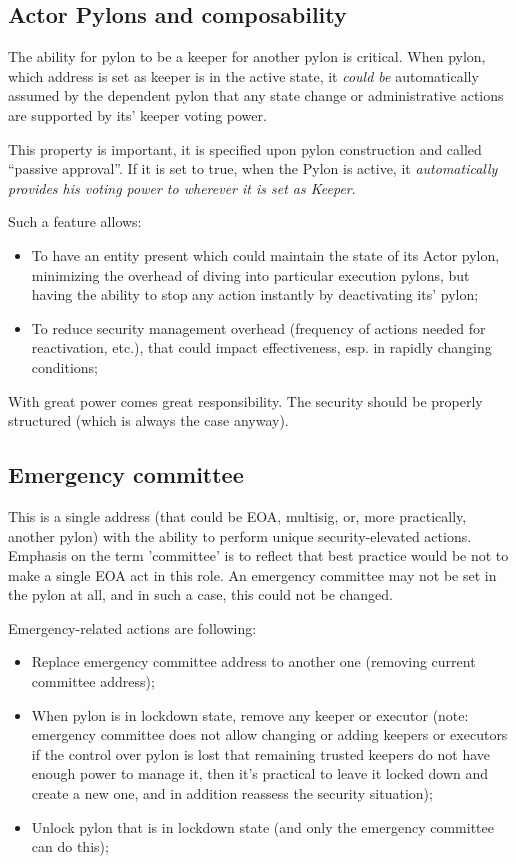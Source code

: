 \documentclass[12pt]{article}
\begin{document}
\subsection{Actor Pylons and composability}
\label{actor_composability}

The ability for pylon to be a keeper for another pylon is critical. When pylon, which address is set as keeper is in the active state, it \emph{could be} automatically assumed by the dependent pylon that any state change or administrative actions are supported by its' keeper voting power.

This property is important, it is specified upon pylon construction and called ``passive approval''. If it is set to true, when the Pylon is active, it \emph{automatically provides his voting power to wherever it is set as Keeper}.

Such a feature allows:
\begin{itemize}
\item{To have an entity present which could maintain the state of its Actor pylon, minimizing the overhead of diving into particular execution pylons, but having the ability to stop any action instantly by deactivating its' pylon;}
\item{To reduce security management overhead (frequency of actions needed for reactivation, etc.), that could impact effectiveness, esp. in rapidly changing conditions;}
\end{itemize}

With great power comes great responsibility. The security should be properly structured (which is always the case anyway).

\subsection{Emergency committee}
\label{emergency_committee}

This is a single address (that could be EOA, multisig, or, more practically, another pylon) with the ability to perform unique security-elevated actions. Emphasis on the term 'committee' is to reflect that best practice would be not to make a single EOA act in this role. An emergency committee may not be set in the pylon at all, and in such a case, this could not be changed.

Emergency-related actions are following:
\begin{itemize}
\item{Replace emergency committee address to another one (removing current committee address);}
\item{When pylon is in lockdown state, remove any keeper or executor (note: emergency committee does not allow changing or adding keepers or executors if the control over pylon is lost that remaining trusted keepers do not have enough power to manage it, then it’s practical to leave it locked down and create a new one, and in addition reassess the security situation);}
\item{Unlock pylon that is in lockdown state (and only the emergency committee can do this);}
\end{itemize}
\end{document}
